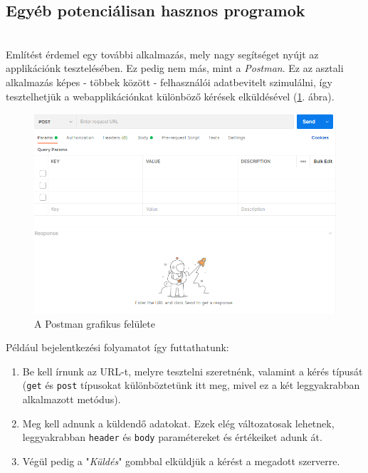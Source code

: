 \subsection{Egyéb potenciálisan hasznos programok}

\\

Említést érdemel egy további alkalmazás, mely nagy segítséget nyújt az applikációnk tesztelésében. Ez pedig nem más, mint a \textit{Postman}. Ez az asztali alkalmazás képes - többek között - felhasználói adatbevitelt szimulálni, így tesztelhetjük a webapplikációnkat különböző kérések elküldésével (\ref{fig:postman}. ábra).

\newpage

\begin{figure}[h]
	\centering
		\includegraphics[width=15truecm, height=9truecm]{images/postman.png}
	\caption{A Postman grafikus felülete}
	\label{fig:postman}
\end{figure}

Például bejelentkezési folyamatot így futtathatunk:

\begin{enumerate}
\item{Be kell írnunk az URL-t, melyre tesztelni szeretnénk, valamint a kérés típusát (\texttt{get} és \texttt{post} típusokat különböztetünk itt meg, mivel ez a két leggyakrabban alkalmazott metódus).}
\item{Meg kell adnunk a küldendő adatokat. Ezek elég változatosak lehetnek, leggyakrabban \texttt{header} és \texttt{body} paramétereket és értékeiket adunk át.}
\item{Végül pedig a "\textit{Küldés}" gombbal elküldjük a kérést a megadott szerverre.}
\end{enumerate}

